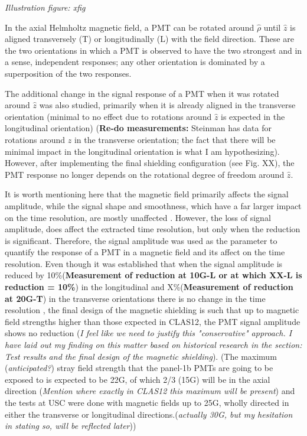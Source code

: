 \documentclass[12pt]{article}
\begin{document}
\textit{Illustration figure: xfig}

In the axial Helmholtz magnetic field, a PMT can be rotated around $\hat{\rho}$ until $\hat{z}$ is aligned transversely (T) or longitudinally (L) with the field direction. These are the two orientations in which a PMT is observed to have the two strongest and in a sense, independent responses; any other orientation is dominated by a superposition of the two responses. 

The additional change in the signal response of a PMT when it was rotated around $\hat{z}$ was also studied, primarily when it is already aligned in the transverse orientation (minimal to no effect due to rotations around $\hat{z}$ is expected in the longitudinal orientation) \cite{Steinman} (\textbf{Re-do measurements:} Steinman has data for rotations around $\hat{z}$ in the transverse orientation; the fact that there will be minimal impact in the longitudinal orientation is what I am hypothesizing). However, after implementing the final shielding configuration (see Fig. XX), the PMT response no longer depends on the rotational degree of freedom around $\hat{z}$.

It is worth mentioning here that the magnetic field primarily affects the signal amplitude, while the signal shape and smoothness, which have a far larger impact on the time resolution, are mostly unaffected \cite{Steinman}. However, the loss of signal amplitude, does affect the extracted time resolution, but only when the reduction is significant. Therefore, the signal amplitude was used as the parameter to quantify the response of a PMT in a magnetic field and its affect on the time resolution. Even though it was established that when the signal amplitude is reduced by 10\%(\textbf{Measurement of reduction at 10G-L or at which XX-L is reduction = 10\%}) in the longitudinal and X\%(\textbf{Measurement of reduction at 20G-T}) in the transverse orientations there is no change in the time resolution \cite{Steinman}, the final design of the magnetic shielding is such that up to magnetic field strengths higher than those expected in CLAS12, the PMT signal amplitude shows no reduction (\textit{I feel like we need to justify this "conservative" approach. I have laid out my finding on this matter based on historical research in the section: Test results and the final design of the magnetic shielding}). (The maximum (\textit{anticipated?}) stray field strength that the panel-1b PMTs are going to be exposed to is expected to be 22G, of which 2/3 (15G) will be in the axial direction (\textit{Mention where exactly in CLAS12 this maximum will be present}) \cite{CLAS12FTOFstudies} and the tests at USC were done with magnetic fields up to 25G, wholly directed in either the transverse or longitudinal directions.(\textit{actually 30G, but my hesitation in stating so, will be reflected later}))
\end{document}
